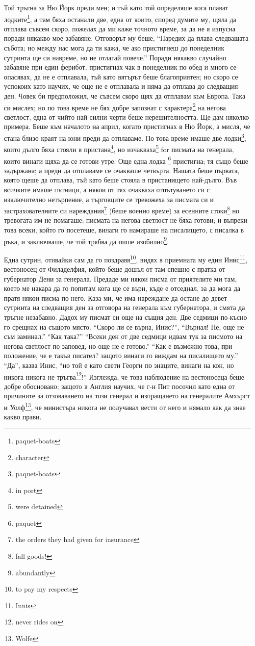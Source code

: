 \documentclass[12pt]{book}
\begin{document}
Той тръгна за Ню Йорк преди мен; и тъй като той определяше кога плават лодките\footnote{paquet-boats}, а там бяха останали две, една от които, според думите му, щяла да отплава съвсем скоро, пожелах да ми каже точното време, за да не я изпусна поради някакво мое забавяне. Отговорът му беше, “Наредих да плава следващата събота; но между нас мога да ти кажа, че ако пристигнеш до понеделник сутринта ще си навреме, но не отлагай повече.” Поради някакво случайно забавяне при един ферибот, пристигнах чак в понеделник по обед и много се опасявах, да не е отплавала, тъй като вятърът беше благоприятен; но скоро се успокоих като научих, че още не е отплавала и няма да отплава до следващия ден. Човек би предположил, че съвсем скоро щях да отплавам към Европа. Така си мислех; но по това време не бях добре запознат с характера\footnote{character} на негова светлост, една от чийто най-силни черти беше нерешителността. Ще дам няколко примера. Беше към началото на април, когато пристигнах в Ню Йорк, а мисля, че стана близо краят на юни преди да отплаваме. По това време имаше две лодки\footnote{paquet-boats}, които дълго бяха стояли в пристана\footnote{in port}, но изчакваха\footnote{were detained} for писмата на генерала, които винаги щяха да се готови утре. Още една лодка \footnote{paquet} пристигна; тя също беше задържана; а преди да отплаваме се очакваше четвърта. Нашата беше първата, която щеше да отплава, тъй като беше стояла в пристанището най-дълго. Във всичките имаше пътници, а някои от тях очакваха отпътуването си с изключително нетърпение, а търговците се тревожеха за писмата си и застрахователните си нареждания\footnote{the orders they had given for insurance} (беше военно време) за есенните стоки\footnote{fall goods!} но тревогата им не помагаше; писмата на негова светлост не бяха готови; и въпреки това всеки, който го посетеше, винаги го намираше на писалището, с писалка в ръка, и заключваше, че той трябва да пише изобилно\footnote{abundantly}.

Една сутрин, отивайки сам да го поздравя\footnote{to pay my respects}, видях в приемната му един Инис\footnote{Innis}, вестоносец от Филаделфия, който беше дошъл от там спешно с пратка от губернатор Дени за генерала. Предаде ми някои писма от приятелите ми там, което ме накара да го попитам кога ще се върн, къде е отседнал, за да мога да пратя някои писма по него. Каза ми, че има нареждане да остане до девет сутринта на следващия ден за отговора на генерала към губернатора, и смята да тръгне незабавно. Дадох му писмат си още на същия ден. Две седмици по-късно го срещнах на същото място. “Скоро ли се върна, Инис?”, “Върнал! Не, още не съм заминал.” “Как така?” “Всеки ден от две седмици идвам тук за писмото на негова светлост по заповед, но още не е готово.” “Как е възможно това, при положение, че е такъв писател? защото винаги го виждам на писалището му.” “Да”, казва Инис, “но той е като свети Георги по знаците, винаги на кон, но никога никога не тръгва\footnote{never rides on}!” Изглежда, че това наблюдение на вестоносеца беше добре обосновано; защото в Англия научих, че г-н Пит посочил като една от причините за отзоваването на този генерал и изпращането на генералите Амхърст и Уолф\footnote{Wolfe}, че министъра никога не получавал вести от него и нямало как да знае какво прави.
\end{document}
